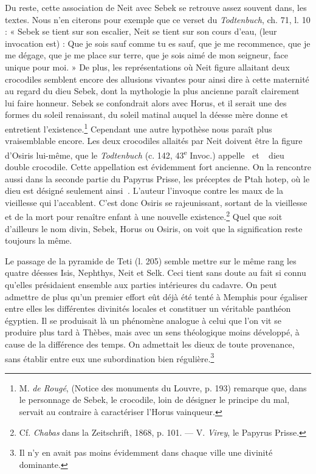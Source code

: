 \documentclass[letterpaper,twocolumn,openany,nodeprecatedcode]{dndbook}
\newcommand*\hieroAADB{}
\newcommand*\hieroAAGT{}
\newcommand*\hieroAAJG{}
\begin{document}
Du reste, cette association de Neit avec Sebek se retrouve assez souvent dans, les textes. Nous n'en citerons pour exemple que ce verset du \emph{Todtenbuch}, ch. 71, l. 10 : « Sebek se tient sur son escalier, Neit se tient sur son cours d'eau, (leur invocation est) : Que je sois sauf comme tu es sauf, que je me recommence, que je me dégage, que je me place sur terre, que je sois aimé de mon seigneur, face unique pour moi. » De plus, les représentations où Neit figure allaitant deux crocodiles semblent encore des allusions vivantes pour ainsi dire à cette maternité au regard du dieu Sebek, dont la mythologie la plus ancienne paraît clairement lui faire honneur. Sebek se confondrait alors avec Horus, et il serait une des formes du soleil renaissant, du soleil matinal auquel la déesse mère donne et entretient l'existence.\footnote{M. \emph{de Rougé}, (Notice des monuments du Louvre, p. 193) remarque que, dans le personnage de Sebek, le crocodile, loin de désigner le principe du mal, servait au contraire à caractériser l'Horus vainqueur.} Cependant une autre hypothèse nous paraît plus vraisemblable encore. Les deux crocodiles allaités par Neit doivent être la figure d'Osiris lui-même, que le \emph{Todtenbuch} (c. 142, 43\textsuperscript{e} Invoc.) appelle $\hieroAAGT\:\hieroAADB$ et $\hieroAAJG\:\hieroAAGT\:\hieroAADB$ dieu double crocodile. Cette appellation est évidemment fort ancienne. On la rencontre aussi dans la seconde partie du Papyrus Prisse, les préceptes de Ptah hotep, où le dieu est désigné seulement ainsi $\hieroAAGT\:\hieroAADB$. L'auteur l'invoque contre les maux de la vieillesse qui l'accablent. C'est donc Osiris se rajeunissant, sortant de la vieillesse et de la mort pour renaître enfant à une nouvelle existence.\footnote{Cf. \emph{Chabas} dans la Zeitschrift, 1868, p. 101. --- V. \emph{Virey}, le Papyrus Prisse.} Quel que soit d'ailleurs le nom divin, Sebek, Horus ou Osiris, on voit que la signification reste toujours la même.

Le passage de la pyramide de Teti (l. 205) semble mettre sur le même rang les quatre déesses Isis, Nephthys, Neit et Selk. Ceci tient sans doute au fait si connu qu'elles présidaient ensemble aux parties intérieures du cadavre. On peut admettre de plus qu'un premier effort eût déjà été tenté à Memphis pour égaliser entre elles les différentes divinités locales et constituer un véritable panthéon égyptien. Il se produisait là un phénomène analogue à celui que l'on vit se produire plus tard à Thèbes, mais avec un sens théologique moins développé, à cause de la différence des temps. On admettait les dieux de toute provenance, sans établir entre eux une subordination bien régulière.\footnote{Il n'y en avait pas moins évidemment dans chaque ville une divinité dominante.}
\end{document}
